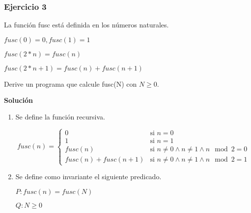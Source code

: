 \documentclass[hidelinks]{article}
\begin{document}
\subsubsection{Ejercicio 3}

La función fusc está definida en los números naturales.\par

$fusc(0) = 0, fusc(1) = 1$\par
$fusc(2*n) = fusc(n)$\par
$fusc(2*n + 1) = fusc(n) + fusc(n + 1)$\par

Derive un programa que calcule fusc(N) con $N \geq 0$.

\textbf{Solución}\par

\begin{enumerate}
	\item Se define la función recursiva.\par

	      \begin{equation}
		      fusc(n) =
		      \begin{cases}
			      0                     & \text{si } n = 0                                      \\
			      1                     & \text{si } n = 1                                      \\
			      fusc(n)               & \text{si } n \neq 0 \land n \neq 1 \land n \mod 2 = 0 \\
			      fusc(n) + fusc(n + 1) & \text{si } n \neq 0 \land n \neq 1 \land n \mod 2 = 1
		      \end{cases}
	      \end{equation} \par

	\item Se define como invariante el siguiente predicado.\par
	      \begin{center}
		      $P: fusc(n) = fusc(N) $\par
		      $Q: N \geq 0 $\par
	      \end{center}
\end{enumerate}

\newpage
\end{document}
